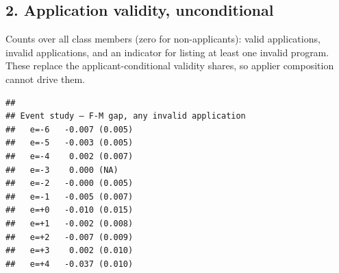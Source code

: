 \documentclass[
]{article}
\begin{document}
\hypertarget{application-validity-unconditional}{%
\subsection{2. Application validity,
unconditional}\label{application-validity-unconditional}}

Counts over all class members (zero for non-applicants): valid
applications, invalid applications, and an indicator for listing at
least one invalid program. These replace the applicant-conditional
validity shares, so applier composition cannot drive them.

\begin{table}[htbp]
   \caption{Application Validity by Gender with Within-Class Gap (Unconditional)}\label{tab: gap validity}
   \centerline{}
\end{table}

\begin{verbatim}
## 
## Event study — F-M gap, any invalid application 
##   e=-6   -0.007 (0.005)
##   e=-5   -0.003 (0.005)
##   e=-4    0.002 (0.007)
##   e=-3    0.000 (NA)
##   e=-2   -0.000 (0.005)
##   e=-1   -0.005 (0.007)
##   e=+0   -0.010 (0.015)
##   e=+1   -0.002 (0.008)
##   e=+2   -0.007 (0.009)
##   e=+3    0.002 (0.010)
##   e=+4   -0.037 (0.010)
\end{verbatim}
\end{document}
